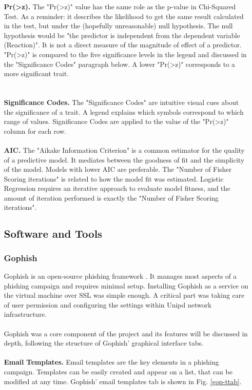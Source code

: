 \documentclass[a4paper]{article}
\begin{document}
\textbf{Pr(\textgreater z).} The "Pr(\textgreater z)" value has the same role as the p-value in Chi-Squared Test. As a reminder: it describes the likelihood to get the same result calculated in the test, but under the (hopefully unreasonable) null hypothesis. The null hypothesis would be "the predictor is independent from the dependent variable (Reaction)". It is not a direct measure of the magnitude of effect of a predictor. 
\\
"Pr(\textgreater z)" is compared to the five significance levels in the legend and discussed in the "Significance Codes" paragraph below. A lower "Pr(\textgreater z)" corresponds to a more significant trait.
\\ \\ \\
\textbf{Significance Codes.} The "Significance Codes" are intuitive visual cues about the significance of a trait. A legend explains which symbols correspond to which range of values. Significance Codes are applied to the value of the "Pr(\textgreater z)" column for each row.
\\ \\
\textbf{AIC.} The "Aikake Information Criterion" is a common estimator for the quality of a predictive model. It mediates between the goodness of fit and the simplicity of the model. Models with lower AIC are preferable. The "Number of Fisher Scoring iterations" is related to how the model fit was estimated. Logistic Regression requires an iterative approach to evaluate model fitness, and the amount of iteration performed is exactly the "Number of Fisher Scoring iterations".

\newpage

\subsection{Software and Tools}

\subsubsection{Gophish}

Gophish is an open-source phishing framework \cite{tools-gophish}. It manages most aspects of a phishing campaign and requires minimal setup. Installing Gophish as a service on the virtual machine over SSL was simple enough. A critical part was taking care of user permission and configuring the settings within Unipd network infrastructure.
\\ \\
Gophish was a core component of the project and its features will be discussed in depth, following the structure of Gophish' graphical interface tabs.
\\ \\
\textbf{Email Templates.} Email templates are the key elements in a phishing campaign. Templates can be easily created and appear on a list, that can be modified at any time. Gophish' email templates tab is shown in Fig. \ref{gop-ttab}.
\end{document}
